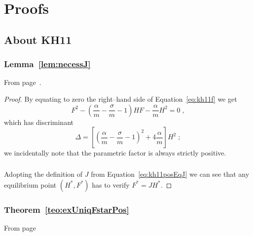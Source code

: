 \chapter{Proofs}

\section{About KH11}
\subsection{ Lemma~\ref{lem:necessJ} }
From page~\pageref{lem:necessJ}.
\begin{proof}
    By equating to zero the right--hand side of Equation~\eqref{eq:kh11f} we get
    $$F^2 - \left( \frac{\alpha}{m} - \frac{\sigma}{m} -1
        \right) H F - \frac{\alpha}{m} H^2 = 0 \; ,$$
    which has discriminant
    $$\Delta = \left[ {\left( \frac{\alpha}{m} - \frac{\sigma}{m} -1
        \right)}^2 + 4 \frac{\alpha}{m}
        \right] H^2 \; ; $$
    we incidentally note that the parametric factor is always strictly positive.

    \paragraph{}
    Adopting the definition of $J$ from Equation~\eqref{eq:kh11posEqJ} we can see that any equilibrium point $(H^*, F^*)$ has to verify $F^* = J H^*$.
\end{proof}

\subsection{ Theorem~\ref{teo:exUniqFstarPos} }
From page~\pageref{teo:exUniqFstarPos}

